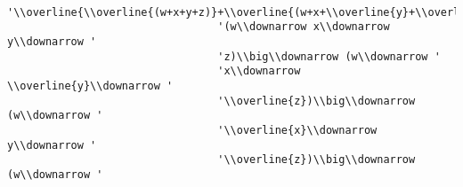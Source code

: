 \begin{verbatim}
                                 '\\overline{\\overline{(w+x+y+z)}+\\overline{(w+x+\\overline{y}+\\overline{z})}+\\overline{(w+\\overline{x}+y+\\overline{z})}+\\overline{(w+\\overline{x}+\\overline{y}+z)}+\\overline{(\\overline{w}+x+y+\\overline{z})}+\\overline{(\\overline{w}+x+\\overline{y}+z)}+\\overline{(\\overline{w}+\\overline{x}+y+z)}+\\overline{(\\overline{w}+\\overline{x}+\\overline{y}+\\overline{z})}}',
                                 '(w\\downarrow x\\downarrow y\\downarrow '
                                 'z)\\big\\downarrow (w\\downarrow '
                                 'x\\downarrow \\overline{y}\\downarrow '
                                 '\\overline{z})\\big\\downarrow (w\\downarrow '
                                 '\\overline{x}\\downarrow y\\downarrow '
                                 '\\overline{z})\\big\\downarrow (w\\downarrow '

\end{verbatim}
